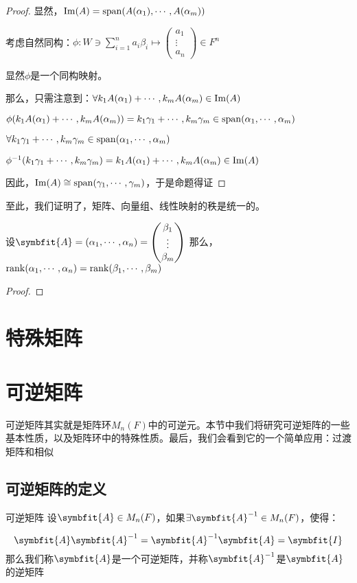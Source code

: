\documentclass[12pt, a4paper, oneside, UTF8]{ctexbook}
\begin{document}
\begin{para}{0}
\begin{proof}
						显然，$\operatorname{Im}(A)=\operatorname{span}(A(\alpha_1),\cdots,A(\alpha_m))$

						考虑自然同构：$\phi : W \ni \sum\limits_{i=1}^{n} a_i \beta_i \mapsto \begin{pmatrix}
							a_1 \\
							\vdots \\
							a_n
						\end{pmatrix} \in F^n$

						显然$\phi $是一个同构映射。

						那么，只需注意到：$\forall k_1A(\alpha_1)+\cdots,k_mA(\alpha_m)\in \operatorname{Im}(A)$
						
						$\phi (k_1A(\alpha_1)+\cdots,k_mA(\alpha_m))=k_1\gamma_1+\cdots,k_m\gamma_m \in \operatorname{span}(\alpha_1,\cdots,\alpha_m)$

						$\forall k_1\gamma_1+\cdots,k_m\gamma_m \in \operatorname{span}(\alpha_1,\cdots,\alpha_m)$

						$\phi^{-1}(k_1\gamma_1+\cdots,k_m\gamma_m)=k_1A(\alpha_1)+\cdots,k_mA(\alpha_m)\in \operatorname{Im}(A)$

						因此，$\operatorname{Im}(A) \cong \operatorname{span}(\gamma_1,\cdots,\gamma _m)$，于是命题得证
					\end{proof}
					至此，我们证明了，矩阵、向量组、线性映射的秩是统一的。
					\begin{proposition}
						设$\symbfit{A}=(\alpha_1,\cdots,\alpha_n)=\begin{pmatrix}
							\beta_1 \\
							\vdots \\
							\beta_m
						\end{pmatrix}$
						那么，$\operatorname{rank}(\alpha_1,\cdots,\alpha_n)=\operatorname{rank}(\beta_1,\cdots,\beta_m)$
					\end{proposition}
					\begin{proof}
						
					\end{proof}
			\end{para}
	\section{特殊矩阵}
	\section{可逆矩阵}
		可逆矩阵其实就是矩阵环$M_n(F)$中的可逆元。本节中我们将研究可逆矩阵的一些基本性质，以及矩阵环中的特殊性质。最后，我们会看到它的一个简单应用：过渡矩阵和相似
		\subsection{可逆矩阵的定义}
			\begin{defn}{可逆矩阵}{}
				设$\symbfit{A} \in M_n(F)$，如果$\exists \symbfit{A}^{-1} \in M_n(F)$，使得：

				\begin{equation}
					\symbfit{A}\symbfit{A}^{-1}=\symbfit{A}^{-1}\symbfit{A}=\symbfit{I}
				\end{equation}
				那么我们称$\symbfit{A}$是一个可逆矩阵，并称$\symbfit{A}^{-1}$是$\symbfit{A}$的逆矩阵
			\end{defn}
\end{document}
